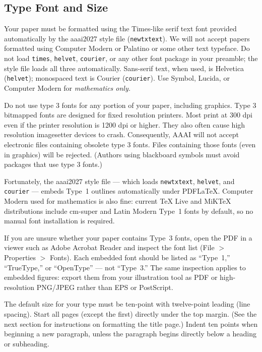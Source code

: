 \subsection{Type Font and Size}
Your paper must be formatted using the Times-like serif text font provided automatically by the aaai2027 style file (\texttt{newtxtext}). We will not accept papers formatted using Computer Modern or Palatino or some other text typeface. Do not load \texttt{times}, \texttt{helvet}, \texttt{courier}, or any other font package in your preamble; the style file loads all three automatically. Sans-serif text, when used, is Helvetica (\texttt{helvet}); monospaced text is Courier (\texttt{courier}). Use Symbol, Lucida, or Computer Modern for \textit{mathematics only.}

Do not use type 3 fonts for any portion of your paper, including graphics. Type 3 bitmapped fonts are designed for fixed resolution printers. Most print at 300 dpi even if the printer resolution is 1200 dpi or higher. They also often cause high resolution imagesetter devices to crash. Consequently, AAAI will not accept electronic files containing obsolete type 3 fonts. Files containing those fonts (even in graphics) will be rejected. (Authors using blackboard symbols must avoid packages that use type 3 fonts.)

Fortunately, the aaai2027 style file --- which loads \texttt{newtxtext}, \texttt{helvet}, and \texttt{courier} --- embeds Type~1 outlines automatically under PDF\LaTeX{}. Computer Modern used for mathematics is also fine: current TeX Live and MiKTeX distributions include cm-super and Latin Modern Type~1 fonts by default, so no manual font installation is required.

If you are unsure whether your paper contains Type~3 fonts, open the PDF in a viewer such as Adobe Acrobat Reader and inspect the font list (File $>$ Properties $>$ Fonts). Each embedded font should be listed as ``Type~1,'' ``TrueType,'' or ``OpenType'' --- not ``Type~3.'' The same inspection applies to embedded figures: export them from your illustration tool as PDF or high-resolution PNG/JPEG rather than EPS or PostScript.

The default size for your type must be ten-point with twelve-point leading (line spacing). Start all pages (except the first) directly under the top margin. (See the next section for instructions on formatting the title page.) Indent ten points when beginning a new paragraph, unless the paragraph begins directly below a heading or subheading.


